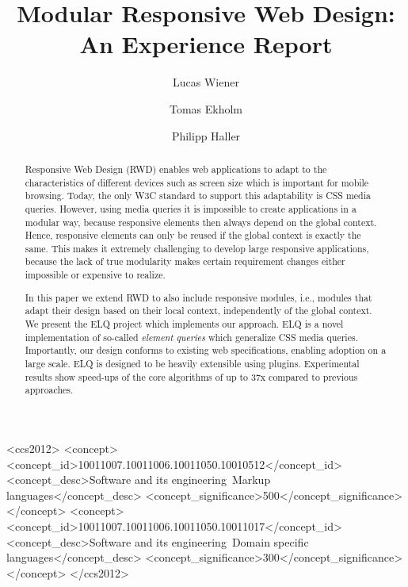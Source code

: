 \documentclass[sigconf,9pt]{acmart}
\newcommand{\elq}{ELQ}
\begin{document}
\title{Modular Responsive Web Design: An Experience Report}

\author{Lucas Wiener}

\author{Tomas Ekholm}

\author{Philipp Haller}

\renewcommand{\shortauthors}{L. Wiener et al.}
\renewcommand{\shorttitle}{Modular Responsive Web Design}

\begin{abstract}
    Responsive Web Design (RWD) enables web applications to adapt to the characteristics of different devices such as screen size which is important for mobile browsing.
    Today, the only W3C standard to support this adaptability is CSS media queries.
    However, using media queries it is impossible to create applications in a modular way, because responsive elements then always depend on the global context.
    Hence, responsive elements can only be reused if the global context is exactly the same.
    This makes it extremely challenging to develop large responsive applications, because the lack of true modularity makes certain requirement changes either impossible or expensive to realize.

    In this paper we extend RWD to also include responsive modules, i.e., modules that adapt their design based on their local context, independently of the global context.
    We present the \elq{} project which implements our approach.
    \elq{} is a novel implementation of so-called \emph{element queries} which generalize CSS media queries.
    Importantly, our design conforms to existing web specifications, enabling adoption on a large scale.
    \elq{} is designed to be heavily extensible using plugins.
    Experimental results show speed-ups of the core algorithms of up to 37x compared to previous approaches.
\end{abstract}

%
%

\begin{CCSXML}
<ccs2012>
<concept>
<concept_id>10011007.10011006.10011050.10010512</concept_id>
<concept_desc>Software and its engineering~Markup languages</concept_desc>
<concept_significance>500</concept_significance>
</concept>
<concept>
<concept_id>10011007.10011006.10011050.10011017</concept_id>
<concept_desc>Software and its engineering~Domain specific languages</concept_desc>
<concept_significance>300</concept_significance>
</concept>
</ccs2012>
\end{CCSXML}
\end{document}
